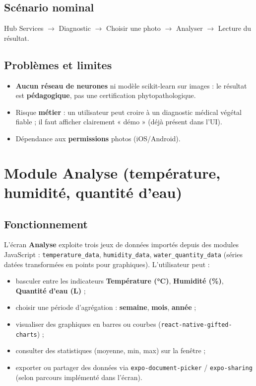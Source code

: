 \documentclass[12pt,a4paper,twoside,openright]{report}
\begin{document}
\subsection{Scénario nominal}
Hub Services $\rightarrow$ Diagnostic $\rightarrow$ Choisir une photo $\rightarrow$ Analyser $\rightarrow$ Lecture du résultat.

\subsection{Problèmes et limites}
\begin{itemize}
  \item \textbf{Aucun réseau de neurones} ni modèle scikit-learn sur images : le résultat est \textbf{pédagogique}, pas une certification phytopathologique.
  \item Risque \textbf{métier} : un utilisateur peut croire à un diagnostic médical végétal fiable ; il faut afficher clairement « démo » (déjà présent dans l'UI).
  \item Dépendance aux \textbf{permissions} photos (iOS/Android).
\end{itemize}

\section{Module Analyse (température, humidité, quantité d'eau)}

\subsection{Fonctionnement}
L'écran \textbf{Analyse} exploite trois jeux de données importés depuis des modules JavaScript : \texttt{temperature\_data}, \texttt{humidity\_data}, \texttt{water\_quantity\_data} (séries datées transformées en points pour graphiques). L'utilisateur peut :
\begin{itemize}
  \item basculer entre les indicateurs \textbf{Température (°C)}, \textbf{Humidité (\%)}, \textbf{Quantité d'eau (L)} ;
  \item choisir une période d'agrégation : \textbf{semaine}, \textbf{mois}, \textbf{année} ;
  \item visualiser des graphiques en barres ou courbes (\texttt{react-native-gifted-charts}) ;
  \item consulter des statistiques (moyenne, min, max) sur la fenêtre ;
  \item exporter ou partager des données via \texttt{expo-document-picker} / \texttt{expo-sharing} (selon parcours implémenté dans l'écran).
\end{itemize}
\end{document}
